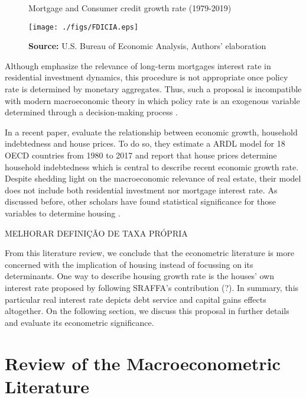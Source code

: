 \documentclass[11pt]{article}
\begin{document}
\begin{figure}[htb]
	\centering
	\caption{Mortgage and Consumer credit growth rate (1979-2019)}
	\label{Fig:CreditFDICIA}
	\texttt{[image: ./figs/FDICIA.eps]}
	\caption*{\textbf{Source:} U.S. Bureau of Economic Analysis, Authors' elaboration}
\end{figure}

Although \textcite{gauger_residential_2003} emphasize the relevance of long-term mortgages interest rate in residential investment dynamics, this procedure is not appropriate once policy rate is determined by monetary aggregates.
Thus, such a proposal is incompatible with modern macroeconomic theory in which policy rate is an exogenous variable determined through a decision-making process \cite[p.~230--256]{lavoie_post-keynesian_2015}.

In a recent paper, \textcite{wood_house_2020} evaluate the relationship between economic growth, household indebtedness and house prices.
To do so, they estimate a ARDL model for 18 OECD countries from 1980 to 2017 and report that house prices determine household indebtedness which is central to describe recent economic growth rate.
Despite shedding light on the macroeconomic relevance of real estate, their model does not include both residential investment nor mortgage interest rate.
As discussed before, other scholars have found statistical significance for those variables to determine housing \cite{gauger_residential_2003}.



MELHORAR DEFINIÇÃO DE TAXA PRÓPRIA

From this literature review, we conclude that the econometric literature is more concerned with the implication of housing instead of focussing on its determinants.
One way to describe housing growth rate is the houses' own interest rate proposed by \textcite{teixeira_crescimento_2015} following SRAFFA's contribution (?).
In summary, this particular real interest rate depicts debt service and capital gains effects altogether.
On the following section, we discuss this proposal in further details and evaluate its econometric significance.



\section{Review of the Macroeconometric Literature}
\label{sec:org6d65944}
\end{document}
